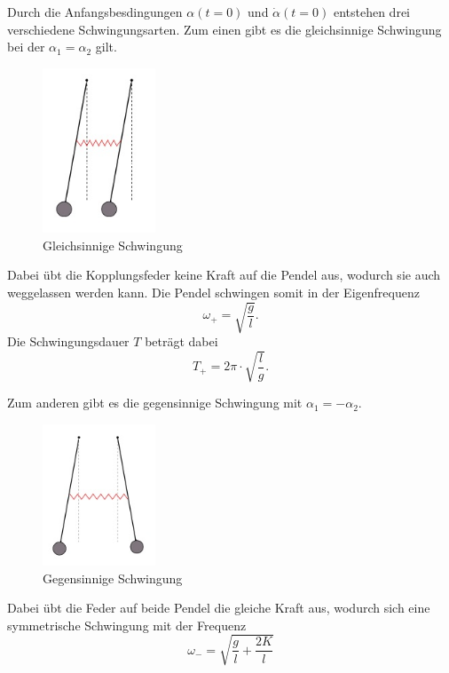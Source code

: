 Durch die Anfangsbesdingungen $\alpha (t=0)$ und $\dot{\alpha}(t=0)$ entstehen drei verschiedene
Schwingungsarten.
Zum einen gibt es die gleichsinnige Schwingung bei der $\alpha_1 = \alpha_2$ gilt.
\begin{figure}
  \centering
  \includegraphics[width= 0.3\textwidth]{bilder/gleichsinnig.jpg}
  \caption{Gleichsinnige Schwingung\,\cite{106}}
\end{figure}
Dabei übt die Kopplungsfeder keine Kraft auf die Pendel aus, wodurch sie auch weggelassen
werden kann. Die Pendel schwingen somit in der Eigenfrequenz
\begin{equation}
  \omega_+ = \sqrt{\frac{g}{l}}.
\end{equation}
Die Schwingungsdauer $T$ beträgt dabei
\begin{equation}
  T_+ = 2 \pi \cdot \sqrt{\frac{l}{g}}.
\end{equation}
\par
Zum anderen gibt es die gegensinnige Schwingung mit $\alpha_1 = -\alpha_2$.
\begin{figure}
  \centering
  \includegraphics[width= 0.3\textwidth]{bilder/gegensinnig.jpg}
  \caption{Gegensinnige Schwingung\,\cite{106}}
\end{figure}
Dabei übt die Feder auf beide Pendel die gleiche Kraft aus, wodurch sich eine symmetrische
Schwingung mit der Frequenz
\begin{equation}
  \omega_-= \sqrt{\frac{g}{l}+\frac{2K}{l}}
\end{equation}

